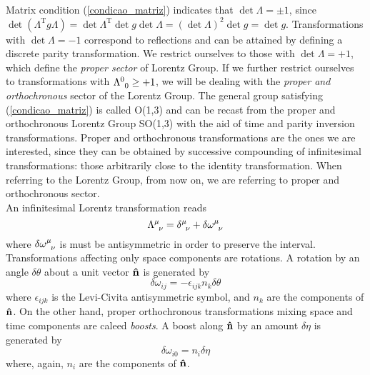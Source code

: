 Matrix condition (\ref{condicao_matriz}) indicates that $\det \Lambda=\pm1$, since $\det(\Lambda^{\text{T}}g\Lambda)=\det\Lambda^{\text{T}}\det g\det\Lambda=(\det \Lambda)^2\det g=\det g$. Transformations with $\det\Lambda=-1$ correspond to reflections and can be attained by defining a discrete parity transformation. We restrict ourselves to those with $\det\Lambda=+1$, which define the \textit{proper sector} of Lorentz Group. If we further restrict ourselves to transformations with $\ten{\Lambda}{0}{0}\geq +1$, we will be dealing with the \textit{proper and orthochronous} sector of the Lorentz Group. The general group satisfying (\ref{condicao_matriz}) is called O(1,3) and can be recast from the proper and orthochronous Lorentz Group SO(1,3) with the aid of time and parity inversion transformations. Proper and orthochronous transformations are the ones we are interested, since they can be obtained by successive compounding of infinitesimal transformations: those arbitrarily close to the identity transformation. When referring to the Lorentz Group, from now on, we are referring to proper and orthochronous sector.\\

An infinitesimal Lorentz transformation reads
\begin{equation}
    \ten{\Lambda}{\mu}{\nu}=\ten{\delta}{\mu}{\nu}+\ten{\delta\omega}{\mu}{\nu}
\end{equation}
where $\ten{\delta\omega}{\mu}{\nu}$ is must be antisymmetric in order to preserve the interval. Transformations affecting only space components are rotations. A rotation by an angle $\delta\theta$ about a unit vector $\vu{n}$ is generated by
\begin{equation}
    \delta\omega_{ij}=-\epsilon_{ijk}n_k\delta\theta
\end{equation}
where $\epsilon_{ijk}$ is the Levi-Civita antisymmetric symbol, and $n_k$ are the components of $\vu{n}$. On the other hand, proper orthochronous transformations mixing space and time components are caleed \textit{boosts}. A boost along $\vu{n}$ by an amount $\delta\eta$ is generated by
\begin{equation}
    \delta\omega_{i0}=n_i\delta\eta
\end{equation}
where, again, $n_i$ are the components of $\vu{n}$.
